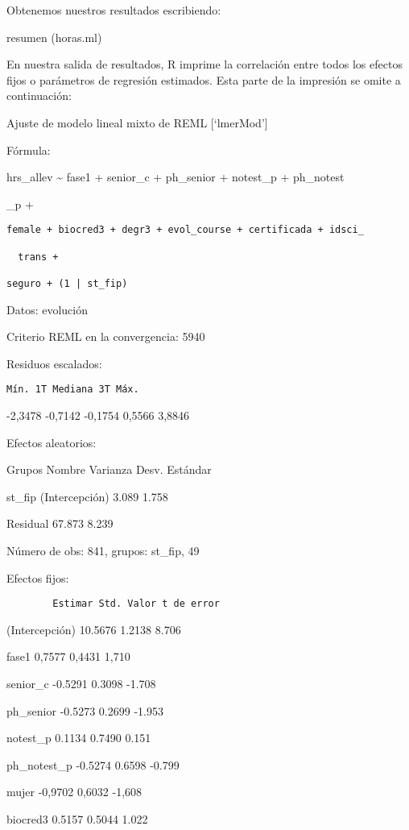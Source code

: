 \documentclass[
]{book}
\begin{document}
Obtenemos nuestros resultados escribiendo:

resumen (horas.ml)

En nuestra salida de resultados, R imprime la correlación entre todos los efectos fijos o parámetros de regresión estimados. Esta parte de la impresión se omite a continuación:

Ajuste de modelo lineal mixto de REML {[}`lmerMod'{]}

Fórmula:

hrs\_allev \textasciitilde{} fase1 + senior\_c + ph\_senior + notest\_p + ph\_notest

\_p +

\begin{verbatim}
female + biocred3 + degr3 + evol_course + certificada + idsci_

  trans +

seguro + (1 | st_fip)
\end{verbatim}

Datos: evolución

Criterio REML en la convergencia: 5940

Residuos escalados:

\begin{verbatim}
Mín. 1T Mediana 3T Máx.
\end{verbatim}

-2,3478 -0,7142 -0,1754 0,5566 3,8846

Efectos aleatorios:

Grupos Nombre Varianza Desv. Estándar

st\_fip (Intercepción) 3.089 1.758

Residual 67.873 8.239

Número de obs: 841, grupos: st\_fip, 49

Efectos fijos:

\begin{verbatim}
        Estimar Std. Valor t de error
\end{verbatim}

(Intercepción) 10.5676 1.2138 8.706

fase1 0,7577 0,4431 1,710

senior\_c -0.5291 0.3098 -1.708

ph\_senior -0.5273 0.2699 -1.953

notest\_p 0.1134 0.7490 0.151

ph\_notest\_p -0.5274 0.6598 -0.799

mujer -0,9702 0,6032 -1,608

biocred3 0.5157 0.5044 1.022
\end{document}
